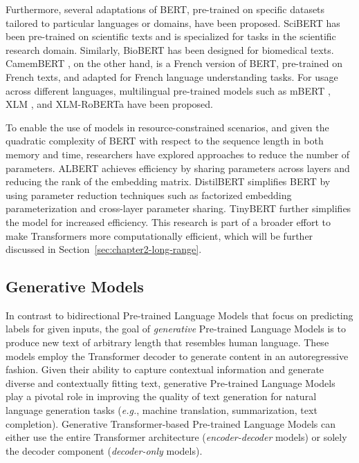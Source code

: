 Furthermore, several adaptations of \ac{BERT}, pre-trained on specific datasets tailored to particular languages or domains, have been proposed. SciBERT \citep{beltagy2019scibert} has been pre-trained on scientific texts and is specialized for tasks in the scientific research domain. Similarly, BioBERT \citep{lee2020biobert} has been designed for biomedical texts. CamemBERT \citep{martin2019camembert}, on the other hand, is a French version of \ac{BERT}, pre-trained on French texts, and adapted for French language understanding tasks. For usage across different languages, multilingual pre-trained models such as mBERT \citep{devlin2018bert}, XLM \citep{lample2019cross}, and XLM-RoBERTa \citep{conneau2019unsupervised} have been proposed. 

To enable the use of models in resource-constrained scenarios, and given the quadratic complexity of \ac{BERT} with respect to the sequence length in both memory and time, researchers have explored approaches to reduce the number of parameters. \ac{ALBERT} achieves efficiency by sharing parameters across layers and reducing the rank of the embedding matrix. DistilBERT \citep{sanh2019distilbert} simplifies \ac{BERT} by using parameter reduction techniques such as factorized embedding parameterization and cross-layer parameter sharing. TinyBERT \citep{jiao2019tinybert} further simplifies the model for increased efficiency. This research is part of a broader effort to make Transformers more computationally efficient, which will be further discussed in Section~\ref{sec:chapter2-long-range}.

\subsection{Generative Models} 

In contrast to bidirectional Pre-trained Language Models that focus on predicting labels for given inputs, the goal of \textit{generative} Pre-trained Language Models is to produce new text of arbitrary length that resembles human language. These models employ the Transformer decoder to generate content in an autoregressive fashion. Given their ability to capture contextual information and generate diverse and contextually fitting text, generative Pre-trained Language Models play a pivotal role in improving the quality of text generation for natural language generation tasks (\textit{e.g.}, machine translation, summarization, text completion). Generative Transformer-based Pre-trained Language Models can either use the entire Transformer architecture (\textit{encoder-decoder} models) or solely the decoder component (\textit{decoder-only} models).

